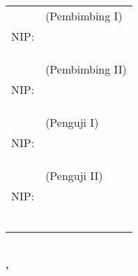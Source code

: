 \noindent
\begin{tabularx}{\textwidth}{X l}
  \advisor{}               & (Pembimbing I)   \\
  NIP: \advisornip{}       &                  \\
                           &                  \\
                           &                  \\
                           &                  \\
  \coadvisor{}             & (Pembimbing II)  \\
  NIP: \coadvisornip{}     &                  \\
                           &                  \\
                           &                  \\
                           &                  \\
  \examinerone{}           & (Penguji I)      \\
  NIP: \examineronenip{}   &                  \\
                           &                  \\
                           &                  \\
                           &                  \\
  \examinertwo{}           & (Penguji II)     \\
  NIP: \examinertwonip{}   &                  \\
                           &                  \\
                           &                  \\
                           &                  \\
                           &                  \\
                           &                  \\
                           &                  \\
\end{tabularx}
\endgroup

\begin{center}
  \textbf{\MakeUppercase{\place{}}\\\MONTH{}, \the\year{}}
\end{center}
\endgroup

\vspace*{\fill}
